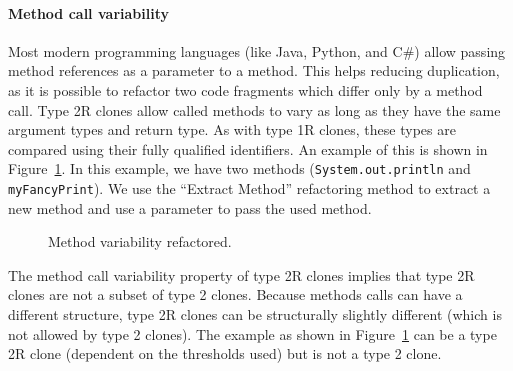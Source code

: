 \paragraph{Method call variability}
Most modern programming languages (like Java, Python, and C\#) allow passing method references as a parameter to a method. This helps reducing duplication, as it is possible to refactor two code fragments which differ only by a method call. Type 2R clones allow called methods to vary as long as they have the same argument types and return type. As with type 1R clones, these types are compared using their fully qualified identifiers. An example of this is shown in Figure~\ref{fig:type2method}. In this example, we have two methods (\texttt{System.out.println} and \texttt{myFancyPrint}). We use the ``Extract Method'' refactoring method to extract a new method and use a parameter to pass the used method.


\begin{figure}[H]
\begin{parcolumns}{2}
\end{parcolumns}
\caption{Method variability refactored.}
\label{fig:type2method}
\end{figure}

The method call variability property of type 2R clones implies that type 2R clones are not a subset of type 2 clones. Because methods calls can have a different structure, type 2R clones can be structurally slightly different (which is not allowed by type 2 clones). The example as shown in Figure~\ref{fig:type2method} can be a type 2R clone (dependent on the thresholds used) but is not a type 2 clone.

